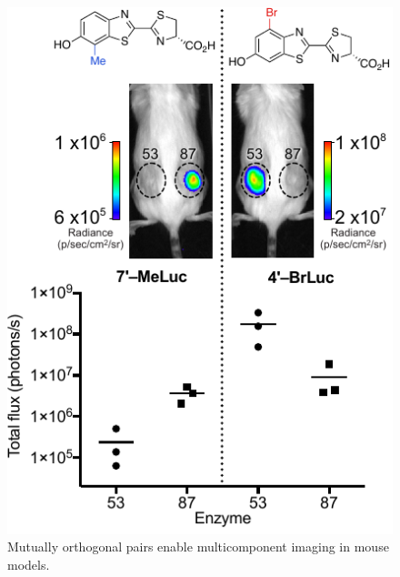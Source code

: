 \documentclass[11pt]{article}
\begin{document}
\begin{figure}
\begin{centering}
\includegraphics[width=\textwidth]{figures/just_mice.pdf}

\end{centering}
\footnotesize
\caption{\label{figure:mice}
Mutually orthogonal pairs enable multicomponent imaging in mouse models.
}
\end{figure}
\end{document}
